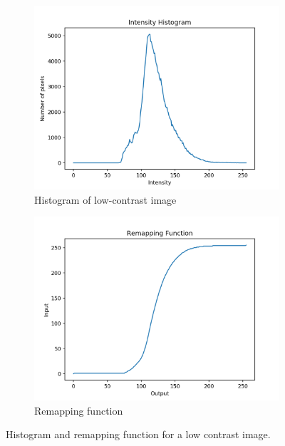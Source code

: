 \documentclass[11pt,a4paper]{article}
\begin{document}
\begin{figure}[ht]
	\centering
	\begin{subfigure}[h]{0.45\textwidth}
		\includegraphics[width=\textwidth]{figs/lc1_hist_bef}
		\caption{Histogram of low-contrast image}
		\label{fig:lc1_hist_before_r}
	\end{subfigure}
	\begin{subfigure}[h]{0.45\textwidth}
		\includegraphics[width=\textwidth]{figs/lc1_remap}
		\caption{Remapping function}
		\label{fig:lc1_remap}
	\end{subfigure}
	\caption{Histogram and remapping function for a low contrast image.}
	\label{fig:lc1_remap_func}
\end{figure}
\end{document}
